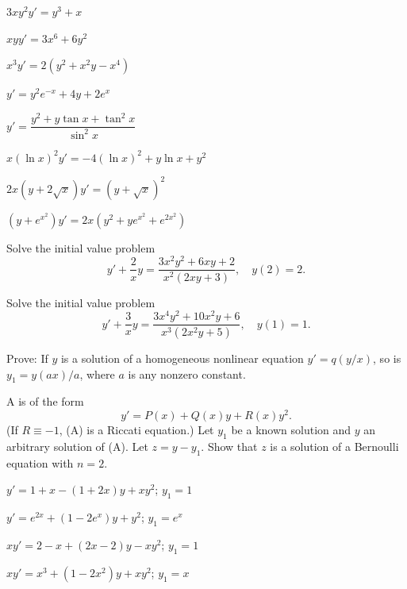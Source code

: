 \begin{exerciselistTwoColumn}
\item\label{exer:2.4.44}$3xy^2y'=y^3+x$
\item\label{exer:2.4.45}$xyy'=3x^6+6y^2$
\item\label{exer:2.4.46}$x^3y'=2(y^2+x^2y-x^4)$
\item\label{exer:2.4.47}$y'=y^2e^{-x}+4y+2e^x$
\item\label{exer:2.4.48}$y'=\dfrac{y^2+y\tan x+\tan^2 x}{\sin^2x}$ 
\item\label{exer:2.4.49}$x(\ln x)^2y'=-4(\ln x)^2+y\ln x+y^2$
\item\label{exer:2.4.50}$2x(y+2\sqrt x)y'=(y+\sqrt x)^2$
\item\label{exer:2.4.51}$(y+e^{x^2})y'=2x(y^2+ye^{x^2}+e^{2x^2})$
\end{exerciselistTwoColumn}

\begin{exerciselist}
\item\label{exer:2.4.52}Solve the initial value problem
\[
y'+\frac{2}{x}y=\frac{3x^2y^2+6xy+2}{x^2(2xy+3)},\quad y(2)=2.
\]

\item\label{exer:2.4.53}Solve the initial value problem
\[
y'+\frac{3}{x}y=\frac{3x^4y^2+10x^2y+6}{x^3(2x^2y+5)},\quad y(1)=1.
\]

\item\label{exer:2.4.54}Prove:  If $y$ is a solution of a homogeneous nonlinear equation
$y'=q(y/x)$,  so is $y_1=y(ax)/a$, where $a$ is any nonzero
constant.


\item\label{exer:2.4.55}A
 is of the form
\[
y'=P(x)+Q(x)y+R(x)y^2.\tag{A}
\]
(If $R\equiv-1$, (A) is a Riccati equation.)
Let $y_1$ be a known solution and $y$ an arbitrary
solution of (A). Let $z=y-y_1$. Show that $z$ is a
solution of a Bernoulli equation with $n=2$.



\item\label{exer:2.4.56}$y'=1+x - (1+2x)y+xy^2$;  \quad    $y_1=1$

\item\label{exer:2.4.57}$y'=e^{2x}+(1-2e^x)y+y^2$;  \quad    $y_1=e^x$

\item\label{exer:2.4.58}$xy'=2-x+(2x-2)y-xy^2$;  \quad    $y_1=1$

\item\label{exer:2.4.59}$xy'=x^3+(1-2x^2)y+xy^2$;  \quad    $y_1=x$

\end{exerciselist}


